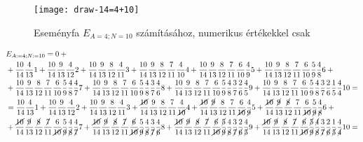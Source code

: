 \documentclass{article}
\begin{document}
	\begin{figure}[H]
		\caption*{Eseményfa $E_{A=4;N=10}$ számításához, numerikus értékekkel csak}
		\centering
		\texttt{[image: draw-14=4+10]}
	\end{figure}
	\begin{align*}
		&E_{A:=4; N:=10} = 0 + {}\\
		&+ \frac{10}{14}\frac{4}{13}1 + \frac{10}{14}\frac{9}{13}\frac{4}{12}2 + \frac{10}{14}\frac{9}{13}\frac{8}{12}\frac{4}{11}3 + \frac{10}{14}\frac{9}{13}\frac{8}{12}\frac{7}{11}\frac{4}{10}4 + \frac{10}{14}\frac{9}{13}\frac{8}{12}\frac{7}{11}\frac{6}{10}\frac{4}{9}5 + \frac{10}{14}\frac{9}{13}\frac{8}{12}\frac{7}{11}\frac{6}{10}\frac{5}{9}\frac{4}{8}6 {}+{}\\
		&+ \frac{10}{14}\frac{9}{13}\frac{8}{12}\frac{7}{11}\frac{6}{10}\frac{5}{9}\frac{4}{8}\frac{4}{7}7 + \frac{10}{14}\frac{9}{13}\frac{8}{12}\frac{7}{11}\frac{6}{10}\frac{5}{9}\frac{4}{8}\frac{3}{7}\frac{4}{6}8 + \frac{10}{14}\frac{9}{13}\frac{8}{12}\frac{7}{11}\frac{6}{10}\frac{5}{9}\frac{4}{8}\frac{3}{7}\frac{2}{6}\frac{4}{5}9 + \frac{10}{14}\frac{9}{13}\frac{8}{12}\frac{7}{11}\frac{6}{10}\frac{5}{9}\frac{4}{8}\frac{3}{7}\frac{2}{6}\frac{1}{5}\frac{4}{4}10 =\\
		&= \frac{10}{14}\frac{4}{13}1 + \frac{10}{14}\frac{9}{13}\frac{4}{12}2 + \frac{10}{14}\frac{9}{13}\frac{8}{12}\frac{4}{11}3 + \frac{\cancel{10}}{14}\frac{9}{13}\frac{8}{12}\frac{7}{11}\frac{4}{\cancel{10}}4 + \frac{\cancel{10}}{14}\frac{\cancel{9}}{13}\frac{8}{12}\frac{7}{11}\frac{6}{\cancel{10}}\frac{4}{\cancel{9}}5 + \frac{\cancel{10}}{14}\frac{\cancel{9}}{13}\frac{\cancel{8}}{12}\frac{7}{11}\frac{6}{\cancel{10}}\frac{5}{\cancel9}\frac{4}{\cancel8}6 {}+{}\\
		&+ \frac{\cancel{10}}{14}\frac{\cancel9}{13}\frac{\cancel8}{12}\frac{\cancel7}{11}\frac{6}{\cancel{10}}\frac{5}{\cancel9}\frac{4}{\cancel8}\frac{4}{\cancel7}7 + \frac{\cancel{10}}{14}\frac{\cancel9}{13}\frac{\cancel8}{12}\frac{\cancel7}{11}\frac{\cancel6}{\cancel{10}}\frac{5}{\cancel9}\frac{4}{\cancel8}\frac{3}{\cancel7}\frac{4}{\cancel6}8 + \frac{\cancel{10}}{14}\frac{\cancel9}{13}\frac{\cancel8}{12}\frac{\cancel7}{11}\frac{\cancel6}{\cancel{10}}\frac{\cancel5}{\cancel9}\frac{4}{\cancel8}\frac{3}{\cancel7}\frac{2}{\cancel6}\frac{4}{\cancel5}9 + \frac{\cancel{10}}{14}\frac{\cancel9}{13}\frac{\cancel8}{12}\frac{\cancel7}{11}\frac{\cancel6}{\cancel{10}}\frac{\cancel5}{\cancel9}\frac{\cancel4}{\cancel8}\frac{3}{\cancel7}\frac{2}{\cancel6}\frac{1}{\cancel5}\frac{4}{\cancel4}10 =\\

\end{align*}
\end{document}
